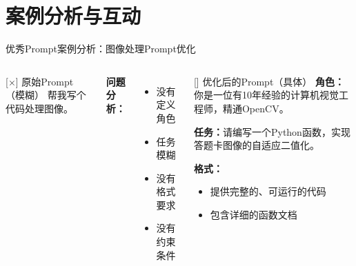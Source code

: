 
\section{案例分析与互动}


\begin{frame}{优秀Prompt案例分析：图像处理Prompt优化}
	\begin{columns}
		\begin{alertblock}{[×] 原始Prompt（模糊）}
			帮我写个代码处理图像。
		\end{alertblock}

		\vspace{0.3cm}

		\textbf{问题分析：}
		\begin{itemize}
			\item 没有定义角色
			\item 任务模糊
			\item 没有格式要求
			\item 没有约束条件
		\end{itemize}

		\begin{exampleblock}{[\checkmark] 优化后的Prompt（具体）}
			\textbf{角色：}你是一位有10年经验的计算机视觉工程师，精通OpenCV。

			\vspace{0.2cm}

			\textbf{任务：}请编写一个Python函数，实现答题卡图像的自适应二值化。

			\vspace{0.2cm}

			\textbf{格式：}
			\begin{itemize}
				\item 提供完整的、可运行的代码
				\item 包含详细的函数文档
			\end{itemize}
		\end{exampleblock}
	\end{columns}
\end{frame}

